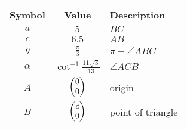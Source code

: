 \begin{tabular}{|c|c|p{3.5cm}|}
\hline
\textbf{Symbol} & \textbf{Value} & \textbf{Description}\\
\hline
$a$ & $5$ & $BC$\\
\hline
$c$ & $6.5$ & $AB$\\
\hline
$\theta$ & $\frac{\pi}{3}$ & $\pi - \angle ABC$\\
\hline
$\alpha$ & $\cot^{-1} \frac{11\sqrt{3}}{13}$ & $\angle ACB$\\
\hline
$A$ & $\begin{pmatrix}0 \\ 0\end{pmatrix}$ & origin\\
\hline
$B$ & $\begin{pmatrix}c \\ 0\end{pmatrix}$ & point of triangle\\
\hline
\end{tabular}